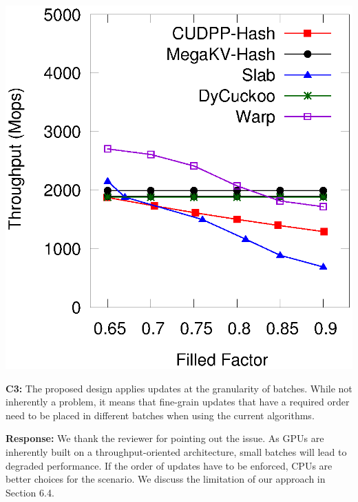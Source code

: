 \begin{minipage}{\textwidth}
\begin{minipage}[b]{0.49\textwidth}
\begin{minipage}{0.49\textwidth}
			\includegraphics[width=\textwidth]{../pic/static-load_factor/tpch/search.eps}
			\centerline{}
		\end{minipage}
	\end{minipage}
\end{minipage}

\begin{shaded}
	\noindent\textbf{C3:} The proposed design applies updates at the granularity of batches.  While not inherently a problem, it means that fine-grain updates that have a required order need to be placed in different batches when using the current algorithms.
\end{shaded}
%
\noindent\textbf{Response:} 
We thank the reviewer for pointing out the issue. As GPUs are inherently built on a throughput-oriented architecture, small batches will lead to degraded performance. 
If the order of updates have to be enforced, CPUs are better choices for the scenario. 
We discuss the limitation of our approach in Section 6.4.

